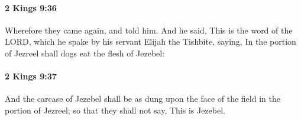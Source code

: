 		\paragraph{2 Kings 9:36} %
			\label{2KINGS-9-36}

			Wherefore they came again, and told him. And he said, This is the word of the LORD, which he spake by his servant Elijah the Tishbite, saying, In the portion of Jezreel shall dogs eat the flesh of Jezebel:


		\paragraph{2 Kings 9:37} %
			\label{2KINGS-9-37}

			And the carcase of Jezebel shall be as dung upon the face of the field in the portion of Jezreel; so that they shall not say, This is Jezebel.

